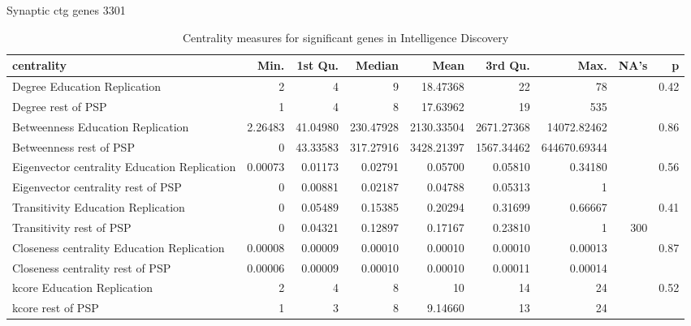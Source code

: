 Synaptic ctg genes  3301%
\begin{table}[ht]
\centering
\begin{adjustbox}{width=\textwidth}
\begin{tabular}{lrrrrrrrr}
  \hline
centrality & Min. & 1st Qu. & Median & Mean & 3rd Qu. & Max. & NA's & p \\ 
  \hline
Degree Education Replication & 2  & 4  & 9  & 18.47368 & 22  & 78  &  & 0.42 \\ 
  Degree rest of PSP & 1  & 4  & 8  & 17.63962 & 19  & 535  &  &  \\ 
  Betweenness Education Replication & 2.26483 & 41.04980 & 230.47928 & 2130.33504 & 2671.27368 & 14072.82462 &  & 0.86 \\ 
  Betweenness rest of PSP & 0  & 43.33583 & 317.27916 & 3428.21397 & 1567.34462 & 644670.69344 &  & \\ 
  Eigenvector centrality Education Replication & 0.00073 & 0.01173 & 0.02791 & 0.05700 & 0.05810 & 0.34180 &  & 0.56 \\ 
  Eigenvector centrality rest of PSP & 0  & 0.00881 & 0.02187 & 0.04788 & 0.05313 & 1  &  &  \\ 
  Transitivity Education Replication & 0  & 0.05489 & 0.15385 & 0.20294 & 0.31699 & 0.66667 &  & 0.41 \\ 
  Transitivity rest of PSP & 0  & 0.04321 & 0.12897 & 0.17167 & 0.23810 & 1  & 300 &  \\ 
  Closeness centrality Education Replication & 0.00008 & 0.00009 & 0.00010 & 0.00010 & 0.00010 & 0.00013 &  & 0.87 \\ 
  Closeness centrality rest of PSP & 0.00006 & 0.00009 & 0.00010 & 0.00010 & 0.00011 & 0.00014 &  & \\ 
  kcore Education Replication & 2  & 4  & 8  & 10  & 14  & 24  &  & 0.52 \\ 
  kcore rest of PSP & 1  & 3  & 8  & 9.14660 & 13  & 24  &  &  \\ 
   \hline
\end{tabular}
\end{adjustbox}
\caption{Centrality measures for significant genes in Intelligence Discovery} 
\label{tab:Centrality measures for significant genes in Intelligence Discovery}
\end{table}

